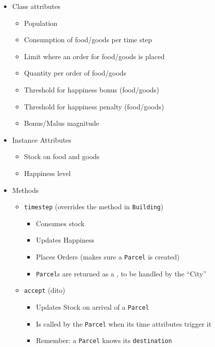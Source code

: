 \begin{frame}[fragile]
%
\vspace{-3pt}
\begin{tcbraster}[raster columns=2,
                  raster equal height,
                  nobeforeafter,
                  raster column skip=0.2cm]
\begin{tcolorbox}[title=Class \texttt{Residential}]

\vspace{-3pt}
\begin{itemize}
\item Class attributes
	\begin{itemize}
	\item Population
	\item Consumption of food/goods per time step
	\item Limit where an order for food/goods is placed
	\item Quantity per order of food/goods
	\item Threshold for happiness bonus (food/goods)
	\item Threshold for happiness penalty (food/goods)
	\item Bonus/Malus magnitude
	\end{itemize}
\item Instance Attributes
	\begin{itemize}
	\item Stock on food and goods
	\item Happiness level
	\end{itemize}
\end{itemize}
\end{tcolorbox}
%
\begin{tcolorbox}[title=Class \texttt{Residential} (Continued)]

\vspace{-3pt}
\begin{itemize}
\item Methods
	\begin{itemize}
	\item \texttt{timestep} (overrides the method in \texttt{Building})
		\begin{itemize}
		\item Consumes stock
		\item Updates Happiness
		\item Places Orders (\ie makes sure a \texttt{Parcel} is created)
		\item \texttt{Parcel}s are returned as a , to be handled by the \enquote{City}
		\end{itemize}
	\item \texttt{accept} (dito)
		\begin{itemize}
		\item Updates Stock on arrival of a \texttt{Parcel}
		\item Is called by the \texttt{Parcel} when its time attributes trigger it
		\item Remember: a \texttt{Parcel} knows its \texttt{destination}
		\end{itemize}
	\end{itemize}
\end{itemize}


\end{tcolorbox}
\end{tcbraster}
\end{frame}
